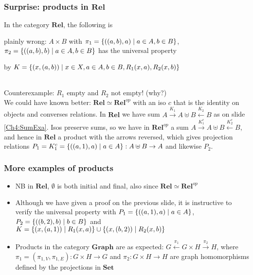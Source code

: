 \documentclass[handout]{beamer}
\newcommand{\bfsf}[1]{{\boldsymbol{#1}}}
\newcommand{\Set}{\bfsf{Set}}
\newcommand{\Gra}{\bfsf{Graph}}
\newcommand{\Rel}{\bfsf{Rel}}
\begin{document}
\frame
  {   
    \frametitle{Surprise: products in $\Rel$}\label{Ch4:RelProd}

In the category $\Rel$, the following is {\color{red}plainly wrong: $A\times B$ with
$\pi_1 = \{((a,b),a)\mid a\in A, b\in B\}$, $\pi_2 =  \{((a,b),b)\mid a\in A, b\in B\}$  has the universal property
by
$K=\{(x,(a,b)) \mid x\in X, a\in A, b\in B, R_1(x,a), R_2(x,b)\}$}
\\\vspace*{0.2cm}
Counterexample: $R_1$ empty and $R_2$ not empty! ({\color{red}why?})
\\\vspace*{0.2cm}
We could have known better: $\Rel\simeq\Rel^{op}$ with an iso $c$ that 
is the identity on objects and converses relations. In $\Rel$ we have sum
$A\stackrel{K_1}{\to} A\uplus B \stackrel{K_2}{\leftarrow}B$
as on slide \ref{Ch4:SumExa}. Isos preserve sums, so
we have in $\Rel^{op}$ a sum
$A\stackrel{K^c_1}{\to} A\uplus B \stackrel{K^c_2}{\leftarrow}B$,
and hence in $\Rel$ a product with the arrows reversed, which gives
projection relations $P_1 = K^c_1 = \{((a,1),a) \mid a\in A\}: A\uplus B \to A$
and likewise $P_2$.
}

\frame
  {   
    \frametitle{More examples of products}\label{Ch4:MorProdExa}

 \begin{itemize}[<+->]
\item NB in $\Rel$, $\emptyset$ is both initial and final, also since $\Rel\simeq\Rel^{op}$
\item Although we have given a proof on the previous slide, it is
instructive to verify the universal property with
$P_1 = \{((a,1),a)\mid a\in A\}$, $P_2 =  \{((b,2),b)\mid b\in B\}$
and $K=\{(x,(a,1)) \mid R_1(x,a)\}\cup \{(x,(b,2)) \mid R_2(x,b)\}$
\item Products in the category $\Gra$ are as expected:
$G \stackrel{\pi_1}{\leftarrow} G\times H \stackrel{\pi_2}{\to}  H$,
where $\pi_1 = (\pi_{1,V},\pi_{1,E}) : G\times H \to G$ and $\pi_2: G\times H \to H$
are graph homomorphisms defined by the projections in $\Set$
\end{itemize}
 
}
\end{document}
